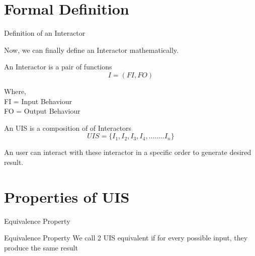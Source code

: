 \documentclass{beamer}
\begin{document}
\section{Formal Definition}
\begin{frame}{Definition of an Interactor}
	
	Now, we can finally define an Interactor mathematically.
	\begin{block}{An Interactor is a pair of functions}
		$$ I = (FI,FO) $$
	\end{block}
	
	Where,\\
	 FI = Input Behaviour \\
	 FO = Output Behaviour
	 
	 
	\pause
	\begin{block}{An UIS is a composition of of Interactors}
		$$ UIS =  \{I_1,I_2,I_3,I_4,........I_n\}  $$
	\end{block}
	An user can interact with these interactor in a specific order to generate desired result.
	
\end{frame}




	\section{Properties of UIS}
	
	\begin{frame}{Equivalence Property}
		\begin{block}{Equivalence Property}
		We call 2 UIS equivalent if for every possible input, they produce the same result
		\end{block}
	 
	\end{frame}
   	
\end{document}
